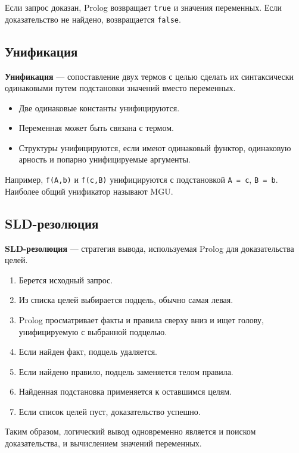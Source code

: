 Если запрос доказан, Prolog возвращает \texttt{true} и значения переменных. Если доказательство не найдено, возвращается \texttt{false}.

\subsection*{Унификация}

\textbf{Унификация} --- сопоставление двух термов с целью сделать их синтаксически одинаковыми путем подстановки значений вместо переменных.

\begin{itemize}
    \item Две одинаковые константы унифицируются.
    \item Переменная может быть связана с термом.
    \item Структуры унифицируются, если имеют одинаковый функтор, одинаковую арность и попарно унифицируемые аргументы.
\end{itemize}

Например, \texttt{f(A,b)} и \texttt{f(c,B)} унифицируются с подстановкой \texttt{A = c}, \texttt{B = b}. Наиболее общий унификатор называют MGU.

\subsection*{SLD-резолюция}

\textbf{SLD-резолюция} --- стратегия вывода, используемая Prolog для доказательства целей.

\begin{enumerate}
    \item Берется исходный запрос.
    \item Из списка целей выбирается подцель, обычно самая левая.
    \item Prolog просматривает факты и правила сверху вниз и ищет голову, унифицируемую с выбранной подцелью.
    \item Если найден факт, подцель удаляется.
    \item Если найдено правило, подцель заменяется телом правила.
    \item Найденная подстановка применяется к оставшимся целям.
    \item Если список целей пуст, доказательство успешно.
\end{enumerate}

Таким образом, логический вывод одновременно является и поиском доказательства, и вычислением значений переменных.

